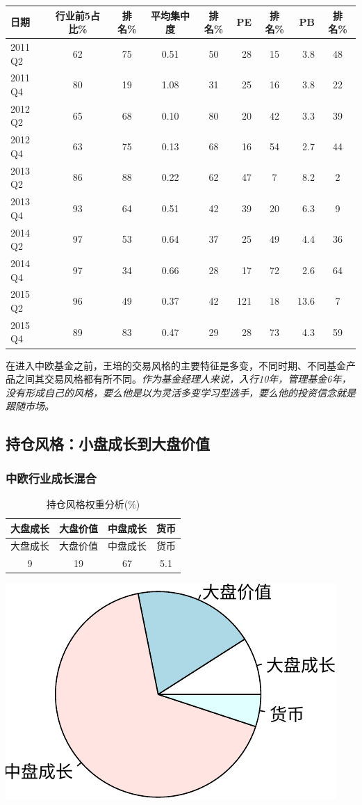 \documentclass[hyperref,]{ctexart}
\begin{document}
\begin{longtable}[]{@{}lccccrcrc@{}}
\toprule
日期 & 行业前5占比\% & 排名\% & 平均集中度 & 排名\% & PE & 排名\% & PB &
排名\%\tabularnewline
\midrule
\endhead
2011 Q2 & 62 & 75 & 0.51 & 50 & 28 & 15 & 3.8 & 48\tabularnewline
2011 Q4 & 80 & 19 & 1.08 & 31 & 25 & 16 & 3.8 & 22\tabularnewline
2012 Q2 & 65 & 68 & 0.10 & 80 & 20 & 42 & 3.3 & 39\tabularnewline
2012 Q4 & 63 & 75 & 0.13 & 68 & 16 & 54 & 2.7 & 44\tabularnewline
2013 Q2 & 86 & 88 & 0.22 & 62 & 47 & 7 & 8.2 & 2\tabularnewline
2013 Q4 & 93 & 64 & 0.51 & 42 & 39 & 20 & 6.3 & 9\tabularnewline
2014 Q2 & 97 & 53 & 0.64 & 37 & 25 & 49 & 4.4 & 36\tabularnewline
2014 Q4 & 97 & 34 & 0.66 & 28 & 17 & 72 & 2.6 & 64\tabularnewline
2015 Q2 & 96 & 49 & 0.37 & 42 & 121 & 18 & 13.6 & 7\tabularnewline
2015 Q4 & 89 & 83 & 0.47 & 29 & 28 & 73 & 4.3 & 59\tabularnewline
\bottomrule
\end{longtable}

在进入中欧基金之前，王培的交易风格的主要特征是多变，不同时期、不同基金产品之间其交易风格都有所不同。\emph{作为基金经理人来说，入行10年，管理基金6年，没有形成自己的风格，要么他是以为灵活多变学习型选手，要么他的投资信念就是跟随市场。}

\subsection{持仓风格：小盘成长到大盘价值}

\subsubsection{中欧行业成长混合}

\begin{longtable}[]{@{}cccc@{}}
\caption{持仓风格权重分析(\%)}\tabularnewline
\toprule
大盘成长 & 大盘价值 & 中盘成长 & 货币\tabularnewline
\midrule
\endfirsthead
\toprule
大盘成长 & 大盘价值 & 中盘成长 & 货币\tabularnewline
\midrule
\endhead
9 & 19 & 67 & 5.1\tabularnewline
\bottomrule
\end{longtable}

\includegraphics{wangpei-details_files/figure-latex/unnamed-chunk-13-1.pdf}
\end{document}
